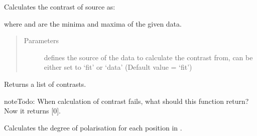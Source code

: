 \documentclass[letterpaper,10pt,english]{sphinxmanual}
\begin{document}
\begin{fulllineitems}
\begin{fulllineitems}
\end{fulllineitems}


\begin{fulllineitems}
\label{\detokenize{measurement:measurement.Measurement.contrast}}
Calculates the contrast of source as:


where  and  are the minima and maxima of the given data.
\begin{quote}\begin{description}
\item[{Parameters}] \leavevmode
{} \textendash{} defines the source of the data to calculate the contrast from,
can be either set to ‘fit’ or ‘data’ (Default value = ‘fit’)

\end{description}\end{quote}

Returns a list of contrasts.

\begin{sphinxadmonition}{note}{\label{measurement:index-2}Todo:}
When calculation of contrast fails, what should this function return? Now it returns {[}0{]}.
\end{sphinxadmonition}

\end{fulllineitems}


\begin{fulllineitems}
\label{\detokenize{measurement:measurement.Measurement.degree_of_polarisation}}
Calculates the degree of polarisation for each position in .

\end{fulllineitems}



\end{fulllineitems}
\end{document}
